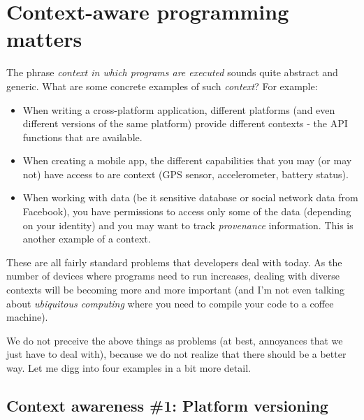
\section{Context-aware programming matters}

The phrase \emph{context in which programs are executed} sounds quite abstract and generic.
What are some concrete examples of such \emph{context}? For example: 

\begin{itemize}
\item When writing a cross-platform application, different platforms (and even different 
   versions of the same platform) provide different contexts - the API functions that are 
   available.
      
\item When creating a mobile app, the different capabilities that you may (or may not) have
   access to are context (GPS sensor, accelerometer, battery status).

\item When working with data (be it sensitive database or social network data from Facebook),
   you have permissions to access only some of the data (depending on your identity) and
   you may want to track \emph{provenance} information. This is another example of a context.
\end{itemize}
 
These are all fairly standard problems that developers deal with today. As the number of 
devices where programs need to run increases, dealing with diverse contexts will be becoming
more and more important (and I'm not even talking about \emph{ubiquitous computing} where you need
to compile your code to a coffee machine).

We do not preceive the above things as problems (at best, annoyances that we just have to 
deal with), because we do not realize that there should be a better way. Let me digg into
four examples in a bit more detail.


\subsection{Context awareness \#1: Platform versioning}

